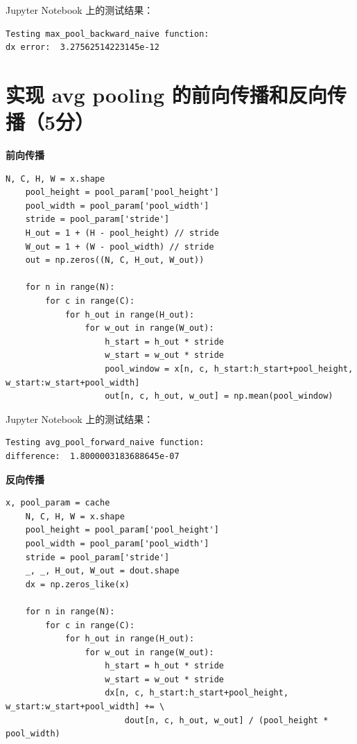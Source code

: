 Jupyter Notebook 上的测试结果：

\begin{lstlisting}[style=cleanpython]
Testing max_pool_backward_naive function:
dx error:  3.27562514223145e-12
\end{lstlisting}

\section{实现 avg pooling 的前向传播和反向传播（5分）}

\textbf{前向传播}

\begin{lstlisting}[style=cleanpython]
    N, C, H, W = x.shape
    pool_height = pool_param['pool_height']
    pool_width = pool_param['pool_width']
    stride = pool_param['stride']
    H_out = 1 + (H - pool_height) // stride
    W_out = 1 + (W - pool_width) // stride
    out = np.zeros((N, C, H_out, W_out))

    for n in range(N):
        for c in range(C):
            for h_out in range(H_out):
                for w_out in range(W_out):
                    h_start = h_out * stride
                    w_start = w_out * stride
                    pool_window = x[n, c, h_start:h_start+pool_height, w_start:w_start+pool_width]
                    out[n, c, h_out, w_out] = np.mean(pool_window)
\end{lstlisting}

Jupyter Notebook 上的测试结果：

\begin{lstlisting}[style=cleanpython]
Testing avg_pool_forward_naive function:
difference:  1.8000003183688645e-07
\end{lstlisting}

\textbf{反向传播}

\begin{lstlisting}[style=cleanpython]
    x, pool_param = cache
    N, C, H, W = x.shape
    pool_height = pool_param['pool_height']
    pool_width = pool_param['pool_width']
    stride = pool_param['stride']
    _, _, H_out, W_out = dout.shape
    dx = np.zeros_like(x)

    for n in range(N):
        for c in range(C):
            for h_out in range(H_out):
                for w_out in range(W_out):
                    h_start = h_out * stride
                    w_start = w_out * stride
                    dx[n, c, h_start:h_start+pool_height, w_start:w_start+pool_width] += \
                        dout[n, c, h_out, w_out] / (pool_height * pool_width)
\end{lstlisting}

